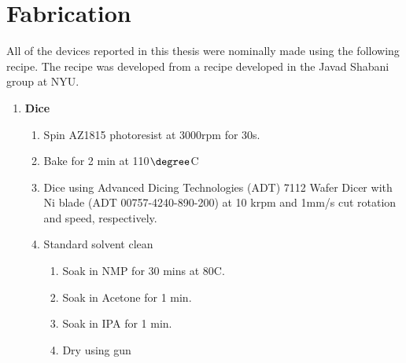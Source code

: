 \section{Fabrication}

All of the devices reported in this thesis were nominally made using the following recipe. The recipe was developed from a recipe developed in the Javad Shabani group at NYU.


\begin{enumerate}
    \item \textbf{Dice}
        \begin{enumerate}
            \item Spin AZ1815 photoresist at 3000rpm for 30s. 
            \item Bake for 2 min at 110$\degree$C
            \item Dice using Advanced Dicing Technologies (ADT) 7112 Wafer Dicer with Ni blade (ADT 00757-4240-890-200) at 10 krpm and 1mm/s cut rotation and speed, respectively.
            \item Standard solvent clean
            \begin{enumerate}
                \item Soak in NMP for 30 mins at 80\degree C.
                \item Soak in Acetone for 1 min.
                \item Soak in IPA for 1 min.
                \item Dry using  gun
                
            \end{enumerate}
            

\end{enumerate}
\end{enumerate}
